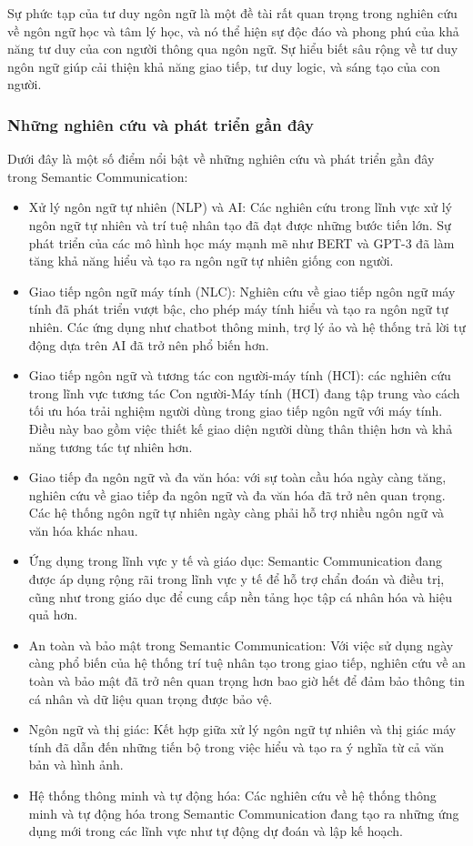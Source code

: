 \documentclass{article} %
\begin{document}
	Sự phức tạp của tư duy ngôn ngữ là một đề tài rất quan trọng trong nghiên cứu về ngôn ngữ học và tâm lý học, và nó thể hiện sự độc đáo và phong phú của khả năng tư duy của con người thông qua ngôn ngữ. Sự hiểu biết sâu rộng về tư duy ngôn ngữ giúp cải thiện khả năng giao tiếp, tư duy logic, và sáng tạo của con người.


\subsubsection{Những nghiên cứu và phát triển gần đây}

Dưới đây là một số điểm nổi bật về những nghiên cứu và phát triển gần đây trong Semantic Communication:

\begin{itemize}

\item Xử lý ngôn ngữ tự nhiên (NLP) và AI: Các nghiên cứu trong lĩnh vực xử lý ngôn ngữ tự nhiên và trí tuệ nhân tạo đã đạt được những bước tiến lớn. Sự phát triển của các mô hình học máy mạnh mẽ như BERT và GPT-3 đã làm tăng khả năng hiểu và tạo ra ngôn ngữ tự nhiên giống con người.
\item Giao tiếp ngôn ngữ máy tính (NLC): Nghiên cứu về giao tiếp ngôn ngữ máy tính đã phát triển vượt bậc, cho phép máy tính hiểu và tạo ra ngôn ngữ tự nhiên. Các ứng dụng như chatbot thông minh, trợ lý ảo và hệ thống trả lời tự động dựa trên AI đã trở nên phổ biến hơn.
\item Giao tiếp ngôn ngữ và tương tác con người-máy tính (HCI): các nghiên cứu trong lĩnh vực tương tác Con người-Máy tính (HCI) đang tập trung vào cách tối ưu hóa trải nghiệm người dùng trong giao tiếp ngôn ngữ với máy tính. Điều này bao gồm việc thiết kế giao diện người dùng thân thiện hơn và khả năng tương tác tự nhiên hơn.
\item Giao tiếp đa ngôn ngữ và đa văn hóa: với sự toàn cầu hóa ngày càng tăng, nghiên cứu về giao tiếp đa ngôn ngữ và đa văn hóa đã trở nên quan trọng. Các hệ thống ngôn ngữ tự nhiên ngày càng phải hỗ trợ nhiều ngôn ngữ và văn hóa khác nhau.
\item Ứng dụng trong lĩnh vực y tế và giáo dục: Semantic Communication đang được áp dụng rộng rãi trong lĩnh vực y tế để hỗ trợ chẩn đoán và điều trị, cũng như trong giáo dục để cung cấp nền tảng học tập cá nhân hóa và hiệu quả hơn.
\item An toàn và bảo mật trong Semantic Communication: Với việc sử dụng ngày càng phổ biến của hệ thống trí tuệ nhân tạo trong giao tiếp, nghiên cứu về an toàn và bảo mật đã trở nên quan trọng hơn bao giờ hết để đảm bảo thông tin cá nhân và dữ liệu quan trọng được bảo vệ.
\item Ngôn ngữ và thị giác: Kết hợp giữa xử lý ngôn ngữ tự nhiên và thị giác máy tính đã dẫn đến những tiến bộ trong việc hiểu và tạo ra ý nghĩa từ cả văn bản và hình ảnh.
\item Hệ thống thông minh và tự động hóa: Các nghiên cứu về hệ thống thông minh và tự động hóa trong Semantic Communication đang tạo ra những ứng dụng mới trong các lĩnh vực như tự động dự đoán và lập kế hoạch.
\end{itemize}
\end{document}
